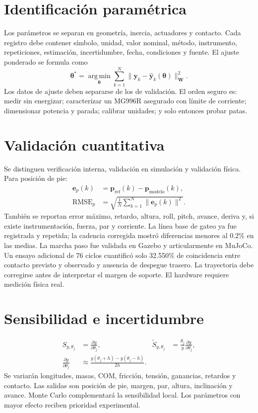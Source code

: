 \documentclass[11pt,letterpaper]{article}
\newcommand{\vect}[1]{\bm{#1}}
\newcommand{\mat}[1]{\bm{#1}}
\newcommand{\argmin}{\operatorname*{arg\,min}}
\begin{document}
\section{Identificación paramétrica}
Los parámetros se separan en geometría, inercia, actuadores y contacto. Cada
registro debe contener símbolo, unidad, valor nominal, método, instrumento,
repeticiones, estimación, incertidumbre, fecha, condiciones y fuente. El ajuste
ponderado se formula como
\begin{equation}
 \vect\theta^*=\argmin_{\vect\theta}\sum_{k=1}^N
 \|\vect y_k-\hat{\vect y}_k(\vect\theta)\|_{\mat W}^2.\label{eq:identification}
\end{equation}
Los datos de ajuste deben separarse de los de validación. El orden seguro es:
medir sin energizar; caracterizar un MG996R asegurado con límite de corriente;
dimensionar potencia y parada; calibrar unidades; y solo entonces probar patas.

\section{Validación cuantitativa}
Se distinguen verificación interna, validación en simulación y validación
física. Para posición de pie:
\begin{align}
 \vect e_p(k)&=\vect p_{\mathrm{ref}}(k)-\vect p_{\mathrm{modelo}}(k),\\
 \operatorname{RMSE}_p&=\sqrt{\frac1N\sum_{k=1}^N\|\vect e_p(k)\|^2}.
\end{align}
También se reportan error máximo, retardo, altura, roll, pitch, avance, deriva y,
si existe instrumentación, fuerza, par y corriente. La línea base de gateo ya
fue registrada y repetida; la cadencia corregida mostró diferencias menores al
0.2\% en las medias. La marcha paso fue validada en Gazebo y articularmente en
MuJoCo. Un ensayo adicional de 76 ciclos cuantificó solo 32.550\% de
coincidencia entre contacto previsto y observado y ausencia de despegue trasero.
La trayectoria debe corregirse antes de interpretar el margen de soporte. El
hardware requiere medición física real.

\section{Sensibilidad e incertidumbre}
\begin{align}
 S_{y,\theta_j}&=\frac{\partial y}{\partial\theta_j},&
 \widetilde S_{y,\theta_j}&=\frac{\theta_j}{y}
 \frac{\partial y}{\partial\theta_j},\\
 \frac{\partial y}{\partial\theta_j}&\approx
 \frac{y(\theta_j+h)-y(\theta_j-h)}{2h}.
\end{align}
Se variarán longitudes, masas, COM, fricción, tensión, ganancias, retardos y
contacto. Las salidas son posición de pie, margen, par, altura, inclinación y
avance. Monte Carlo complementará la sensibilidad local. Los parámetros con
mayor efecto reciben prioridad experimental.
\end{document}
